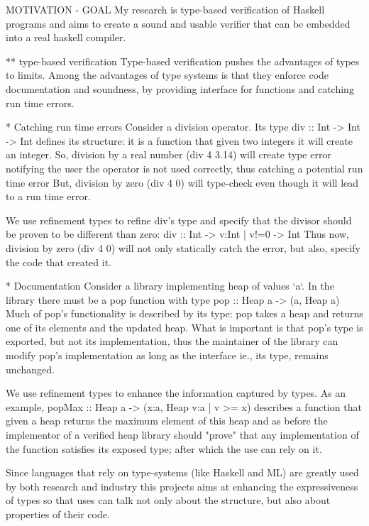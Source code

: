 MOTIVATION - GOAL
My research is type-based verification of Haskell programs 
and aims to create a sound and usable verifier that can be
embedded into a real haskell compiler.

** type-based verification
Type-based verification pushes the advantages of types to limits.
Among the advantages of type systems is that they enforce code documentation and soundness, by providing interface for functions and catching run time errors.

* Catching run time errors
Consider a division operator. Its type 
div :: Int -> Int -> Int
defines its structure: it is a function that given two integers it will create an integer.
%
So, division by a real number (div 4 3.14) will create type error notifying the user the operator is not used correctly, thus catching a potential run time error 
But, division by zero (div 4  0) will type-check even though it will lead to a run time error.

We use refinement types to refine div's type and specify that the divisor should be proven to be different than zero: 
div :: Int -> {v:Int | v!=0} -> Int
Thus now, division by zero (div 4 0) will not only statically catch the 
error, but also, specify the code that created it.

* Documentation
Consider a library implementing heap of values `a`.
In the library there must be a pop function with type
pop :: Heap a -> (a, Heap a)
Much of pop's functionality is described by its type:
pop takes a heap and returns one of its elements and the updated heap.
What is important is that pop's type is exported, but not its implementation, 
thus the maintainer of the library can modify pop's implementation  as long as the interface ie., its type, remains unchanged.


We use refinement types to enhance the information captured by types.
As an example, 
popMax :: Heap a -> (x:a, Heap {v:a | v >= x})
describes a function that given a heap returns the maximum element of this heap and as before the implementor of a verified heap library 
should "prove" that any implementation of the function satisfies its exposed type; after which the use can rely on it.


Since languages that rely on type-systems (like Haskell and ML) 
are greatly used by both research and industry this projects aims 
at enhancing the expressiveness of types 
so that uses can talk not only about the structure, but also about properties of their code.  



